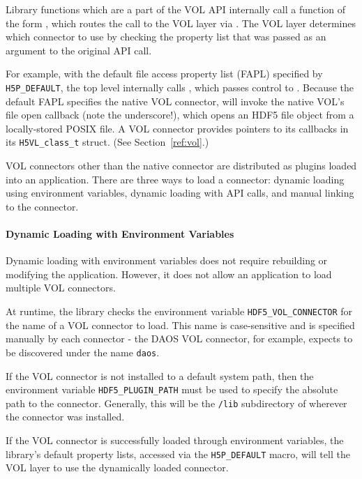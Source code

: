 Library functions which are a part of the VOL API internally call a function of the form , which routes the call to the VOL layer via . The VOL layer determines which connector to use by checking the property list that was passed as an argument to the original API call.

For example, with the default file access property list (FAPL) specified by \texttt{H5P\_DEFAULT}, the top level  internally calls , which passes control to . Because the default FAPL specifies the native VOL connector,  will invoke the native VOL's file open callback  (note the underscore!), which opens an HDF5 file object from a locally-stored POSIX file. A VOL connector provides pointers to its callbacks in its \texttt{H5VL\_class\_t} struct. (See Section~\ref{ref:vol}.)

VOL connectors other than the native connector are distributed as plugins loaded into an application. There are three ways to load a connector: dynamic loading using environment variables, dynamic loading with API calls, and manual linking to the connector.

\paragraph{Dynamic Loading with Environment Variables} Dynamic loading with environment variables does not require rebuilding or modifying the application. However, it does not allow an application to load multiple VOL connectors.

At runtime, the library checks the environment variable \texttt{HDF5\_VOL\_CONNECTOR} for the name of a VOL connector to load. This name is case-sensitive and is specified manually by each connector - the DAOS VOL connector, for example, expects to be discovered under the name \texttt{daos}.

If the VOL connector is not installed to a default system path, then the environment variable \texttt{HDF5\_PLUGIN\_PATH} must be used to specify the absolute path to the connector. Generally, this will be the \texttt{/lib} subdirectory of wherever the connector was installed.

If the VOL connector is successfully loaded through environment variables, the library's default property lists, accessed via the \texttt{H5P\_DEFAULT} macro, will tell the VOL layer to use the dynamically loaded connector.

